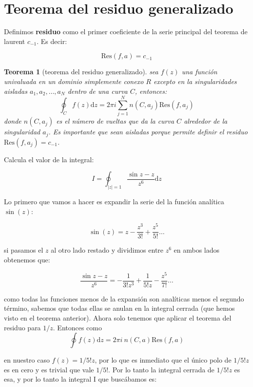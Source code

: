 \documentclass[12pt,a4paper]{book}
\newcommand{\D}{\mathrm{d}}
\newcommand{\Res}{\mathrm{Res}}
\newtheorem{theorem}{Teorema}[section]
\begin{document}
\section{Teorema del residuo generalizado}

Definimos \textbf{residuo} como el primer coeficiente de la serie principal del teorema de laurent $c_{-1}$. Es decir:

\begin{equation}
\Res (f,a) = c_{-1}
\end{equation}

\begin{theorem}[teorema del residuo generalizado]
sea $f(z)$ una función univaluada en un dominio simplemente conexo $R$ excepto en la singularidades aisladas $a_1,a_2, \ldots, a_N$ dentro de una curva $C$, entonces:
$$ \oint_C f(z) \D z = 2 \pi i \sum_{j=1}^N n(C,a_j) \Res(f,a_j) $$
donde $n(C,a_j)$ es el número de vueltas que da la curva $C$ alrededor de la singularidad $a_j$. Es importante que sean aisladas porque permite definir el residuo $\Res(f,a_j) = c_{-1}$. 
\end{theorem}



\hrulefill

Calcula el valor de la integral:

$$ I = \oint_{|z|=1} \dfrac{\sin z - z}{z^6} \D z $$

Lo primero que vamos a hacer es expandir la serie del la función analítica $\sin (z)$: 

$$ \sin(z) = z - \dfrac{z^3}{3!} + \dfrac{z^5}{5!} \ldots $$


si pasamos el $z$ al otro lado restado y dividimos entre $z^6$ en ambos lados obtenemos que:

\begin{equation}
\dfrac{\sin z - z }{z^6} = - \dfrac{1}{3!  z^3} + \dfrac{1}{5! z} - \dfrac{z^5}{7!} \ldots
\end{equation}

como todas las funciones menos de la expansión son analíticas menos el segundo término, sabemos que todas ellas se anulan en la integral cerrada (que hemos visto en el  teorema anterior). Ahora solo tenemos que aplicar el teorema del residuo para $1/z$. Entonces como
\
$$ \oint f(z) \D z = 2 \pi i \ n(C,a) \Res(f,a) $$

en nuestro caso $f(z)=1/5!z$, por lo que es inmediato que el único polo de $1/5!z$ es en cero y es trivial que vale $1/5!$. Por lo tanto la integral cerrada de $1/5!z$ es esa, y por lo tanto la integral I que buscábamos es:
\end{document}
